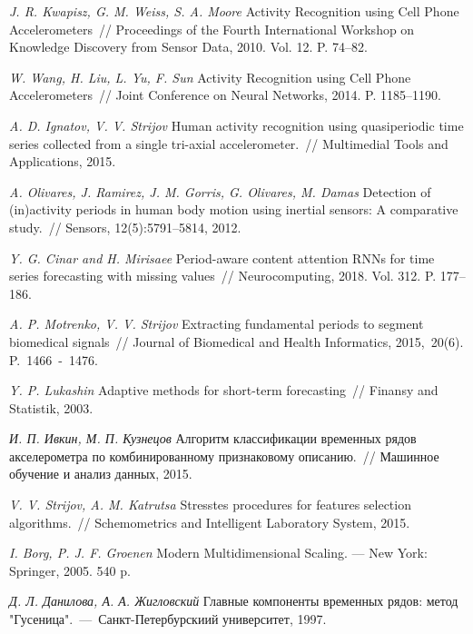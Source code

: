 \documentclass[12pt, twoside]{article}
\numberwithin{equation}{section}
\begin{document}
\begin{thebibliography}{99}
	\textit{J. R. Kwapisz, G. M. Weiss, S. A. Moore} Activity Recognition using Cell Phone Accelerometers~// Proceedings of the Fourth International Workshop on Knowledge Discovery from Sensor Data, 2010. Vol. 12. P. 74--82.
	
	\textit{W. Wang, H. Liu, L. Yu, F. Sun} Activity Recognition using Cell Phone Accelerometers~// Joint Conference on Neural Networks, 2014. P. 1185--1190.
	
	\textit{A. D. Ignatov, V. V. Strijov} Human activity recognition using quasiperiodic time series collected from a single tri-axial accelerometer.~// Multimedial Tools and Applications, 2015.
	
	\textit{A. Olivares, J. Ramirez, J. M. Gorris, G. Olivares, M. Damas} Detection of (in)activity periods in human body motion using inertial sensors: A comparative study.~// Sensors, 12(5):5791–5814, 2012.
	
	\textit{Y. G. Cinar and H. Mirisaee} Period-aware content attention RNNs for time series forecasting with missing values~// Neurocomputing, 2018. Vol. 312. P. 177--186.
	
	\textit{A. P. Motrenko, V. V. Strijov} Extracting fundamental periods to segment biomedical signals~// Journal of Biomedical and Health Informatics, 2015,~20(6). P.~1466~-~1476.
	
	\textit{Y. P. Lukashin} Adaptive methods for short-term forecasting~// Finansy and Statistik, 2003.
	
	\textit{И. П. Ивкин,  М. П. Кузнецов} Алгоритм классификации временных рядов акселерометра по комбинированному признаковому описанию.~// Машинное обучение и анализ данных, 2015.
	
	\textit{V. V. Strijov, A. M. Katrutsa} Stresstes procedures for features selection algorithms.~// Schemometrics and Intelligent Laboratory System, 2015.
	
	\textit{I. Borg, P. J. F. Groenen} Modern Multidimensional Scaling. --- New York: Springer, 2005. 540 p.
	
	
	\textit{Д. Л. Данилова, А. А. Жигловский} Главные компоненты временных рядов: метод "Гусеница".~---~Санкт-Петербурскиий университет, 1997.
	

	
\end{thebibliography}
\end{document}
